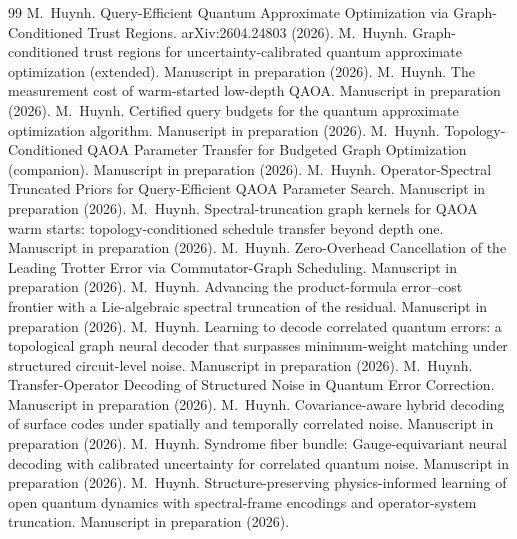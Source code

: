 \documentclass[aps,prresearch,reprint,amsmath,amssymb,nofootinbib,superscriptaddress,floatfix]{revtex4-2}
\theoremstyle{definition}
\theoremstyle{remark}
\theoremstyle{plain}
\begin{document}
\begin{thebibliography}{99}
 M.~Huynh. Query-Efficient Quantum Approximate Optimization via Graph-Conditioned Trust Regions. arXiv:2604.24803 (2026).
 M.~Huynh. Graph-conditioned trust regions for uncertainty-calibrated quantum approximate optimization (extended). Manuscript in preparation (2026).
 M.~Huynh. The measurement cost of warm-started low-depth QAOA. Manuscript in preparation (2026).
 M.~Huynh. Certified query budgets for the quantum approximate optimization algorithm. Manuscript in preparation (2026).
 M.~Huynh. Topology-Conditioned QAOA Parameter Transfer for Budgeted Graph Optimization (companion). Manuscript in preparation (2026).
 M.~Huynh. Operator-Spectral Truncated Priors for Query-Efficient QAOA Parameter Search. Manuscript in preparation (2026).
 M.~Huynh. Spectral-truncation graph kernels for QAOA warm starts: topology-conditioned schedule transfer beyond depth one. Manuscript in preparation (2026).
 M.~Huynh. Zero-Overhead Cancellation of the Leading Trotter Error via Commutator-Graph Scheduling. Manuscript in preparation (2026).
 M.~Huynh. Advancing the product-formula error--cost frontier with a Lie-algebraic spectral truncation of the residual. Manuscript in preparation (2026).
 M.~Huynh. Learning to decode correlated quantum errors: a topological graph neural decoder that surpasses minimum-weight matching under structured circuit-level noise. Manuscript in preparation (2026).
 M.~Huynh. Transfer-Operator Decoding of Structured Noise in Quantum Error Correction. Manuscript in preparation (2026).
 M.~Huynh. Covariance-aware hybrid decoding of surface codes under spatially and temporally correlated noise. Manuscript in preparation (2026).
 M.~Huynh. Syndrome fiber bundle: Gauge-equivariant neural decoding with calibrated uncertainty for correlated quantum noise. Manuscript in preparation (2026).
 M.~Huynh. Structure-preserving physics-informed learning of open quantum dynamics with spectral-frame encodings and operator-system truncation. Manuscript in preparation (2026).

\end{thebibliography}
\end{document}
